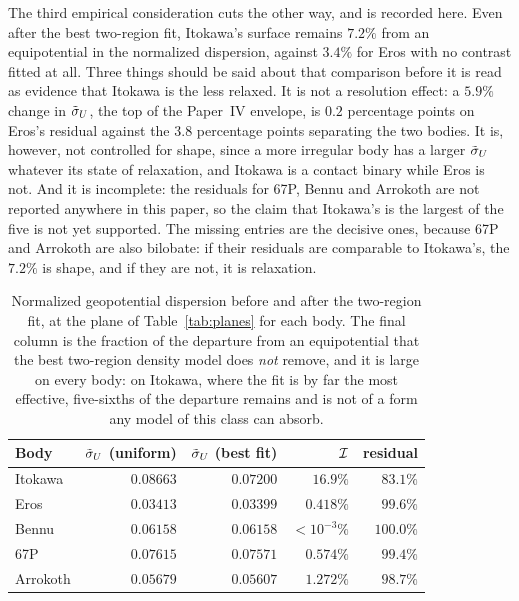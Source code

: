 The third empirical consideration cuts the other way, and is recorded here.
Even after the best two-region fit, Itokawa's surface remains $7.2\%$ from
an equipotential in the normalized dispersion, against $3.4\%$ for Eros with
no contrast fitted at all. Three things should be said about that
comparison before it is read as evidence that Itokawa is the less relaxed.
It is not a resolution effect: a $5.9\%$ change in $\tilde{\sigma}_{U}$, the top of
the Paper~IV envelope, is $0.2$ percentage points on Eros's residual against
the $3.8$ percentage points separating the two bodies. It is, however, not
controlled for shape, since a more irregular body has a larger $\tilde{\sigma}_{U}$
whatever its state of relaxation, and Itokawa is a contact binary while Eros
is not. And it is incomplete: the residuals for 67P, Bennu and Arrokoth are
not reported anywhere in this paper, so the claim that Itokawa's is the
largest of the five is not yet supported. The missing entries are the
decisive ones, because 67P and Arrokoth are also bilobate: if their
residuals are comparable to Itokawa's, the $7.2\%$ is shape, and if they are
not, it is relaxation.

\begin{table}[htbp]
\centering
\small
\caption{Normalized geopotential dispersion before and after the two-region
fit, at the plane of Table~\ref{tab:planes} for each body. The final column
is the fraction of the departure from an equipotential that the best
two-region density model does \emph{not} remove, and it is large on every
body: on Itokawa, where the fit is by far the most effective, five-sixths of
the departure remains and is not of a form any model of this class can
absorb.}
\label{tab:residual}
\setlength{\tabcolsep}{10pt}
\begin{tabular}{lrrrr}
\toprule
Body & $\tilde{\sigma}_{U}$ (uniform) & $\tilde{\sigma}_{U}$ (best fit) & $\mathcal{I}$
 & residual \\
\midrule
Itokawa  & $0.08663$ & $0.07200$ & $16.9\%$  & $83.1\%$ \\
Eros     & $0.03413$ & $0.03399$ & $0.418\%$ & $99.6\%$ \\
Bennu    & $0.06158$ & $0.06158$ & $<10^{-3}\%$ & $100.0\%$ \\
67P      & $0.07615$ & $0.07571$ & $0.574\%$ & $99.4\%$ \\
Arrokoth & $0.05679$ & $0.05607$ & $1.272\%$ & $98.7\%$ \\
\bottomrule
\end{tabular}
\end{table}

